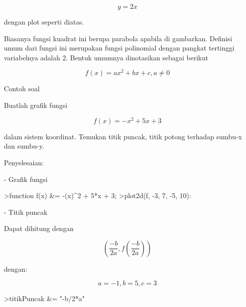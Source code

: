 \documentclass[a4paper,10pt]{article}
\begin{document}
\begin{eulernotebook}
\begin{eulercomment}
\begin{eulercomment}
\begin{eulercomment}
\begin{eulercomment}
\begin{eulercomment}
\end{eulercomment}
\begin{eulerformula}
\[
y = 2x
\]
\end{eulerformula}
\begin{eulercomment}
dengan plot seperti diatas.
\end{eulercomment}
\begin{eulercomment}
Biasanya fungsi kuadrat ini berupa parabola apabila di gambarkan.
Definisi umum dari fungsi ini merupakan fungsi polinomial dengan
pangkat  tertinggi variabelnya adalah 2. Bentuk umumnya dinotasikan
sebagai berikut

\end{eulercomment}
\begin{eulerformula}
\[
f(x) = ax^{2} + bx + c, a\neq0
\]
\end{eulerformula}
\begin{eulercomment}
\end{eulercomment}
\begin{eulercomment}
Contoh soal

Buatlah grafik fungsi\\
\end{eulercomment}
\begin{eulerformula}
\[
f(x) = -x^{2} + 5x + 3
\]
\end{eulerformula}
\begin{eulercomment}
dalam sistem koordinat. Temukan titik puncak, titik potong terhadap
sumbu-x dan sumbu-y.

Penyelesaian:

- Grafik fungsi
\end{eulercomment}
\begin{eulerprompt}
>function f(x) &= -(x)^2 + 5*x + 3;
>plot2d(f, -3, 7, -5, 10):
\end{eulerprompt}
\begin{eulercomment}
- Titik puncak

Dapat dihitung dengan 

\end{eulercomment}
\begin{eulerformula}
\[
(\frac{-b}{2a}, f(\frac{-b}{2a}))
\]
\end{eulerformula}
\begin{eulercomment}
dengan:\\
\end{eulercomment}
\begin{eulerformula}
\[
a = -1, b = 5, c = 3
\]
\end{eulerformula}
\begin{eulerprompt}
>titikPuncak &= "-b/2*a"
\end{eulerprompt}
\begin{euleroutput}
  

\end{euleroutput}
\end{eulercomment}
\end{eulercomment}
\end{eulercomment}
\end{eulercomment}
\end{eulernotebook}
\end{document}
